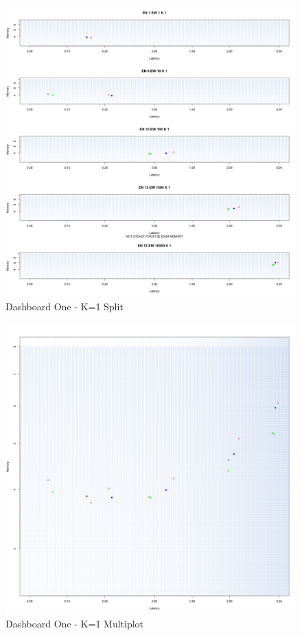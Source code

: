 \begin{figure}[htbp]
	\centering
	\includegraphics[width=\linewidth]{images/dashboard-1-split}	
	\caption[\textsc{Analyser} Investigation Stack - Level 0 - Dashboard One - Split Version]{Dashboard One - K=1 Split} 
	\label{fig:result_dashboard_ka}
\end{figure}
\begin{figure}[h!tbp]
	\centering
	\includegraphics[width=0.90\linewidth]{images/dashboard-1}	
	\caption[\textsc{Analyser} Investigation Stack - Level 0 - Dashboard One - Multiplot Version]{Dashboard One - K=1 Multiplot} 
	\label{fig:result_dashboard_kb}
\end{figure}
